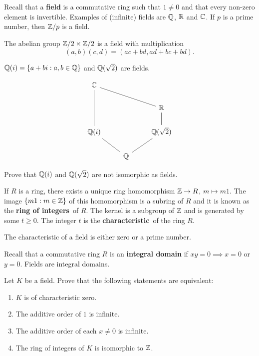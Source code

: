 \chapter{}


Recall that a \textbf{field} is a commutative
ring such that $1\ne 0$ and 
that every non-zero element is invertible. Examples
of (infinite) fields are $\mathbb{Q}$, $\mathbb{R}$ and $\mathbb{C}$. If $p$
is a prime number, then $\mathbb{Z}/p$ is a field. 

\begin{example}
	The abelian group $\mathbb{Z}/2\times\mathbb{Z}/2$ is a field
	with multiplication
	\[
		(a,b)(c,d)=(ac+bd,ad+bc+bd).
	\]
\end{example}

\begin{example}
	$\mathbb{Q}(i)=\{a+bi:a,b\in\mathbb{Q}\}$ and 
	$\mathbb{Q}(\sqrt{2})$ are fields.
\end{example}

\[
\begin{tikzcd}
	{\mathbb{C}} \\
	&& {\mathbb{R}} \\
	{\mathbb{Q}(i)} && {\mathbb{Q}(\sqrt{2})} \\
	& {\mathbb{Q}}
	\arrow[no head, from=3-3, to=4-2]
	\arrow[no head, from=2-3, to=3-3]
	\arrow[no head, from=1-1, to=3-1]
	\arrow[no head, from=3-1, to=4-2]
	\arrow[no head, from=1-1, to=2-3]
\end{tikzcd}
\]


\begin{exercise}
	\label{xca:Q(i)}
	Prove that $\mathbb{Q}(i)$ and $\mathbb{Q}(\sqrt{2})$ are not isomorphic as fields.
\end{exercise}

If $R$ is a ring, there exists a unique ring homomorphism
$\mathbb{Z}\to R$, $m\mapsto m1$. The image $\{m1:m\in\mathbb{Z}\}$ 
of this homomorphism is a subring 
of $R$ and it is known as the \textbf{ring of integers} of $R$. The
kernel is a subgroup of $\mathbb{Z}$ and is generated by
some $t\geq0$. The integer $t$ is 
the \textbf{characteristic} of the ring $R$. 

\begin{exercise}
	The characteristic of a field is either zero or
	a prime number. 
\end{exercise}

Recall that a commutative ring $R$ is an \textbf{integral 
domain} if $xy=0\implies x=0$ or $y=0$. Fields
are integral domains. 

\begin{exercise}
	Let $K$ be a field. Prove that
	the following statements are equivalent:
	\begin{enumerate}
		\item $K$ is of characteristic zero.
		\item The additive order of $1$ is infinite. 
		\item The additive order of each $x\ne0$ is infinite.
		\item The ring of integers of $K$ is isomorphic to $\mathbb{Z}$.
	\end{enumerate}
\end{exercise}

